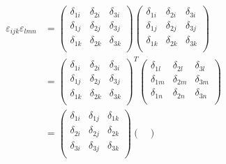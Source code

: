 \begin{align}
    \varepsilon_{ijk}\varepsilon_{lmn}
     & =\begin{pmatrix}
                  \delta_{1i} & \delta_{2i} & \delta_{3i} \\
                  \delta_{1j} & \delta_{2j} & \delta_{3j} \\
                  \delta_{1k} & \delta_{2k} & \delta_{3k} \\
              \end{pmatrix}\begin{pmatrix}
                                           \delta_{1i} & \delta_{2i} & \delta_{3i} \\
                                           \delta_{1j} & \delta_{2j} & \delta_{3j} \\
                                           \delta_{1k} & \delta_{2k} & \delta_{3k} \\
                                       \end{pmatrix}\nonumber   \\
     & =\begin{pmatrix}
                  \delta_{1i} & \delta_{2i} & \delta_{3i} \\
                  \delta_{1j} & \delta_{2j} & \delta_{3j} \\
                  \delta_{1k} & \delta_{2k} & \delta_{3k} \\
              \end{pmatrix}^T\begin{pmatrix}
                                             \delta_{1l} & \delta_{2l} & \delta_{3l} \\
                                             \delta_{1m} & \delta_{2m} & \delta_{3m} \\
                                             \delta_{1n} & \delta_{2n} & \delta_{3n} \\
                                         \end{pmatrix}\nonumber \\
     & =\begin{pmatrix}
                  \delta_{1i} & \delta_{1j} & \delta_{1k} \\
                  \delta_{2i} & \delta_{2j} & \delta_{2k} \\
                  \delta_{3i} & \delta_{3j} & \delta_{3k} \\
              \end{pmatrix}\begin{pmatrix}

\end{pmatrix}
\end{align}
